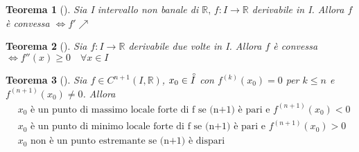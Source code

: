 \documentclass[10pt,a4paper]{article}
\newtheorem{teorema}{Teorema}[section]
\newcommand{\teor}[2][]{\begin{teorema}[#1]#2\end{teorema}}
\newcommand{\R}{\mathbb{R}}
\renewcommand{\,}{\text{, }}
\begin{document}
\teor{
    Sia I intervallo non banale di $\R \, f : I \to \R$ derivabile in I. Allora $f$ è convessa $\iff f' \nearrow$
}
\teor{
    Sia $f : I \to \R$ derivabile due volte in I. Allora $f$ è convessa $\iff f''(x) \ge 0 \quad \forall x \in I$
}
\teor{
    Sia $f \in C^{n+1}(I, \R)$, $x_0 \in \accentset{\circ}{I}$ con $f^{(k)}(x_0) = 0$ per $k \le n$ e $f^{(n+1)}(x_0) \ne 0$. Allora
    \begin{align*}
         & x_0 \text{ è un punto di massimo locale forte di f se (n+1) è pari e } f^{(n+1)}(x_0) < 0 \\
         & x_0 \text{ è un punto di minimo locale forte di f se (n+1) è pari e } f^{(n+1)}(x_0) > 0  \\
         & x_0 \text{ non è un punto estremante se (n+1) è dispari}
    \end{align*}
}
\end{document}
